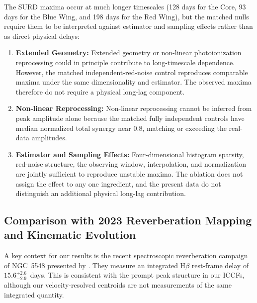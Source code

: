 \documentclass[fleqn,usenatbib]{mnras}
\begin{document}
The SURD maxima occur at much longer timescales (128 days for the Core, 93 days for the Blue Wing, and 198 days for the Red Wing), but the matched nulls require them to be interpreted against estimator and sampling effects rather than as direct physical delays:
\begin{enumerate}
\item \textbf{Extended Geometry:} Extended geometry or non-linear photoionization reprocessing could in principle contribute to long-timescale dependence. However, the matched independent-red-noise control reproduces comparable maxima under the same dimensionality and estimator. The observed maxima therefore do not require a physical long-lag component.
\item \textbf{Non-linear Reprocessing:} Non-linear reprocessing cannot be inferred from peak amplitude alone because the matched fully independent controls have median normalized total synergy near 0.8, matching or exceeding the real-data amplitudes.
\item \textbf{Estimator and Sampling Effects:} Four-dimensional histogram sparsity, red-noise structure, the observing window, interpolation, and normalization are jointly sufficient to reproduce unstable maxima. The ablation does not assign the effect to any one ingredient, and the present data do not distinguish an additional physical long-lag contribution.
\end{enumerate}

\subsection{Comparison with 2023 Reverberation Mapping and Kinematic Evolution}
\label{sec:comparison_xi}

A key context for our results is the recent spectroscopic reverberation campaign of NGC~5548 presented by \citet{Xi2025}. They measure an integrated H\(\beta\) rest-frame delay of \(15.6_{-2.9}^{+2.6}\)~days. This is consistent with the prompt peak structure in our ICCFs, although our velocity-resolved centroids are not measurements of the same integrated quantity.
\end{document}

